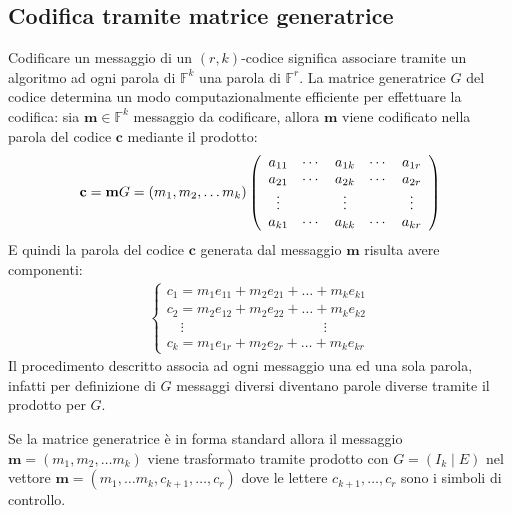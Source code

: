 \subsection{Codifica tramite matrice generatrice}

Codificare un messaggio di un $(r,k)$-codice significa associare tramite un algoritmo ad ogni parola di $\mathbb{F}^{k}$ una parola di $\mathbb{F}^{r}$. La matrice generatrice $G$ del codice determina un modo computazionalmente efficiente per effettuare la codifica: sia $\mathbf{m} \in \mathbb{F}^{k}$ messaggio da codificare, allora $\mathbf{m}$ viene codificato nella parola del codice $\mathbf{c}$ mediante il prodotto: 
\begin{align*}
  \mathbf{c} = \mathbf{m}G = (m_1 ,m_2 , \dots m_{k}) 
  \left(
  \begin{array} {c c c c c}
  a_{11} & \cdots & a_{1k} & \cdots & a_{1r} \\
  a_{21} & \cdots & a_{2k} & \cdots & a_{2r} \\
  \vdots &  & \vdots & & \vdots \\
  a_{k1} & \cdots & a_{kk} & \cdots & a_{kr} 
  \end{array}
  \right)
\end{align*}
E quindi la parola del codice $\mathbf{c}$ generata dal messaggio $\mathbf{m}$ risulta avere componenti:
\begin{align*}
  \left\{
  \begin{array} {l}
  c_{1} = m_{1}e_{11} + m_{2}e_{21} + \dots + m_{k}e_{k1} \\
  c_{2} = m_{2}e_{12} + m_{2}e_{22} + \dots + m_{k}e_{k2} \\
  \quad \vdots \qquad \qquad \qquad \qquad \qquad \vdots\\
  c_{k} = m_{1}e_{1r} + m_{2}e_{2r} + \dots + m_{k}e_{kr}
  \end{array}
  \right. 
\end{align*}
Il procedimento descritto associa ad ogni messaggio una ed una sola parola, infatti per definizione di $G$ messaggi diversi diventano parole diverse tramite il prodotto per $G$.

Se la matrice generatrice è in forma standard allora il messaggio $\mathbf{m} = (m_1 ,m_2 , \dots m_{k}) $ viene trasformato tramite prodotto con $ G = (I_{k} \mid E)$ nel vettore $\mathbf{m} = (m_1 ,\dots m_{k}, c_{k+1}, \dots , c_{r})$ dove le lettere $c_{k+1}, \dots , c_{r}$ sono i simboli di controllo.


